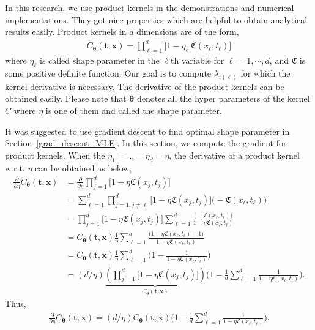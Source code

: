 \documentclass{iitthesis}          %
\newcommand{\bm}[1]{\boldsymbol{#1}}
\newcommand{\vtheta}{{\bm{\theta}}}
\newcommand{\vt}{\bm{t}}
\newcommand{\vx}{\bm{x}}
\newcommand\secref{Section~\ref}
\begin{document}
\label{sec:product_kernel}

In this research, we use product kernels in the demonstrations and numerical implementations. They got nice properties which are helpful to obtain analytical results easily. Product kernels in $d$ dimensions are of the form,
\begin{align}
\label{eqn:prod_kernel}
C_\vtheta(\vt, \vx) = 
\prod_{\ell=1}^d \biggl[ 1 - \eta_\ell \; \mathfrak{C}(x_\ell,t_\ell) \biggr]
\end{align}
where $\eta_\ell$ is called shape parameter in the $\ell$th variable for $\ell=1,\cdots,d$, and $\mathfrak{C}$ is some positive definite function. Our goal is to compute $\bar{\lambda}_{i(\ell)}$ for which the kernel derivative is necessary. The derivative of the product kernels can be obtained easily. Please note that $\vtheta$ denotes all the hyper parameters of the kernel $C$ where $\eta$ is one of them and called the shape parameter.

\label{sec:deriv_of_kernel}
It was suggested to use gradient descent to find optimal shape parameter in \secref{grad_descent_MLE}. In this section, we compute the gradient for product kernels. When the $\eta_1=\dots=\eta_d=\eta$, the derivative of a product kernel  w.r.t. $\eta$ can be obtained as below,
\begin{align*}
\frac{\partial}{\partial \eta} C_\vtheta(\vt, \vx) 
& =
\frac{\partial}{\partial \eta} 
\prod_{j=1}^d \biggl[
1 - \eta \mathfrak{C}(x_j,t_j) \biggr] %
\\
& = 
\sum_{\ell=1}^d  
\prod_{j=1, j \neq \ell}^d \biggl[
1 - \eta \mathfrak{C}(x_j,t_j) \biggr]
\biggl( - \mathfrak{C}(x_\ell,t_\ell) \biggr)
\\
& =
\prod_{j=1}^d \biggl[
1 - \eta \mathfrak{C}(x_j,t_j) \biggr]
\sum_{\ell=1}^d 
\frac{
	\biggl( - \mathfrak{C}(x_\ell,t_\ell) \biggr)
}{
	1 - \eta \mathfrak{C}(x_\ell,t_\ell) 
}
\\
& =
C_\vtheta(\vt, \vx) 
\frac{1}{\eta}
\sum_{\ell=1}^d 
\frac{
	\biggl(1 - \eta \mathfrak{C}({x_\ell,t_\ell})  - 1 \biggr)
}{
	1 - \eta \mathfrak{C}(x_\ell,t_\ell) 
}
\\
& =
C_\vtheta(\vt, \vx) 
\frac{1}{\eta}
\sum_{\ell=1}^d 
\biggl(
1 - 
\frac{1
}{
	1 - \eta \mathfrak{C}(x_\ell,t_\ell) 
}
\biggr)
\\
& =
({d}/{\eta} )
\underbrace{
	\left(
	\prod_{j=1}^d \biggl[
	1 - \eta \mathfrak{C}(x_j,t_j) \biggr]
	\right) }_
{ C_\vtheta(\vt, \vx) }
\biggl(
1 - 
\frac{1}{d} \sum_{\ell=1}^d
\frac{1}
{ 1 - \eta \mathfrak{C}(x_\ell,t_\ell) }
\biggr)
.
\end{align*}
Thus,
\begin{align*}
\frac{\partial}{\partial \eta} C_\vtheta(\vt, \vx) = ({d}/{\eta} ) C_\vtheta(\vt, \vx) 
\biggl(
1 - 
\frac{1}{d} \sum_{\ell=1}^d
\frac{1}
{ 1 - \eta \mathfrak{C}(x_\ell,t_\ell) }
\biggr).
\end{align*}
\end{document}
